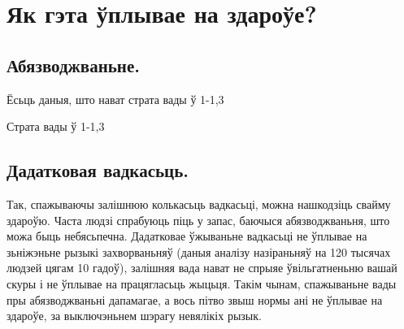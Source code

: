 \section{Як гэта ўплывае на здароўе?}

\subsection{Абязводжваньне.}
Ёсьць даныя, што нават страта вады ў 1-1,3%

Страта вады ў 1-1,3%

\subsection{Дадатковая вадкасьць.}
Так, спажываючы залішнюю колькасьць вадкасьці, можна нашкодзіць свайму здароўю. Часта людзі спрабуюць піць у запас, баючыся абязводжваньня, што можа быць небясьпечна. Дадатковае ўжываньне вадкасьці не ўплывае на зьніжэньне рызыкі захворваньняў (даныя аналізу назіраньняў на 120 тысячах людзей цягам 10 гадоў), залішняя вада нават не спрыяе ўвільгатненьню вашай скуры і не ўплывае на працягласьць жыцьця. Такім чынам, спажываньне вады пры абязводжваньні дапамагае, а вось пітво звыш нормы ані не ўплывае на здароўе, за выключэньнем шэрагу невялікіх рызык.

